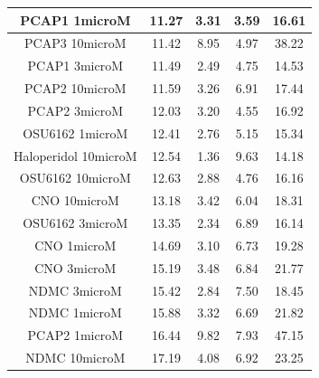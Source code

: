 \documentclass[a4paper,12pt]{article}
\begin{document}
\begin{table}[h!]
\begin{tabular}{|c|c|c|c|c|}
PCAP1 1microM         & 11.27 & 3.31 & 3.59 & 16.61 \\ \hline
PCAP3 10microM      & 11.42 & 8.95 & 4.97 & 38.22 \\ \hline
PCAP1 3microM         & 11.49 & 2.49 & 4.75 & 14.53 \\ \hline
PCAP2 10microM        & 11.59 & 3.26 & 6.91 & 17.44 \\ \hline
PCAP2 3microM         & 12.03 & 3.20  & 4.55 & 16.92 \\ \hline
OSU6162 1microM       & 12.41 & 2.76 & 5.15 & 15.34 \\ \hline
Haloperidol 10microM  & 12.54 & 1.36 & 9.63 & 14.18 \\ \hline
OSU6162 10microM      & 12.63 & 2.88 & 4.76 & 16.16 \\ \hline
CNO 10microM          & 13.18 & 3.42 & 6.04 & 18.31 \\ \hline
OSU6162 3microM       & 13.35 & 2.34 & 6.89 & 16.14 \\ \hline
CNO 1microM           & 14.69 & 3.10  & 6.73 & 19.28 \\ \hline
CNO 3microM           & 15.19 & 3.48 & 6.84 & 21.77 \\ \hline
NDMC 3microM          & 15.42 & 2.84 & 7.50  & 18.45 \\ \hline
NDMC 1microM          & 15.88 & 3.32 & 6.69 & 21.82 \\ \hline
PCAP2 1microM         & 16.44 & 9.82 & 7.93 & 47.15 \\ \hline
NDMC 10microM         & 17.19 & 4.08 & 6.92 & 23.25 \\ \hline
\end{tabular}
\end{table}
\newpage
\end{document}
